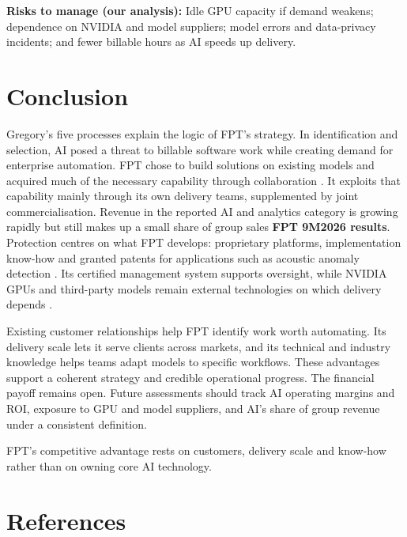 \documentclass[a4paper,12pt]{report}
\begin{document}
\textbf{Risks to manage (our analysis):} Idle GPU capacity if demand weakens; dependence on NVIDIA and model suppliers; model errors and data-privacy incidents; and fewer billable hours as AI speeds up delivery.



\chapter{Conclusion}

Gregory's five processes explain the logic of FPT's strategy. In identification and selection, AI posed a threat to billable 
software work while creating demand for enterprise automation. FPT chose to build solutions on existing models and acquired 
much of the necessary capability through collaboration \cite{A8,A13,A16}. It exploits that capability mainly through its 
own delivery teams, supplemented by joint commercialisation. Revenue in the reported AI and analytics category is growing 
rapidly but still makes up a small share of group sales \textbf{FPT 9M2026 results}. Protection centres on what FPT develops: 
proprietary platforms, implementation know-how and granted patents for applications such as acoustic anomaly detection \cite{S13}. 
Its certified management system supports oversight, while NVIDIA GPUs and third-party models remain external technologies on which 
delivery depends \cite{S23,A21,A7}.

Existing customer relationships help FPT identify work worth automating. Its delivery scale lets it serve clients across markets, and its technical and industry knowledge helps teams adapt models to specific workflows. These advantages support a coherent strategy and credible operational progress. The financial payoff remains open. Future assessments should track AI operating margins and ROI, exposure to GPU and model suppliers, and AI's share of group revenue under a consistent definition.

FPT's competitive advantage rests on customers, delivery scale and know-how rather than on owning core AI technology.


\chapter*{References}
\printbibliography[heading=none]
\end{document}
